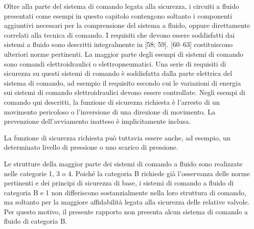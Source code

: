 \begin{center}
    \begin{minipage}{\textwidth}
        \centering
        \captionsetup{hypcap=false}
        \resizebox{0.92\textwidth}{!}{}
        \label{fig:08-01}
    \end{minipage}
\end{center}

\begin{center}
    \begin{minipage}{\textwidth}
        \centering
        \captionsetup{hypcap=false}
        \resizebox{!}{0.62\textheight}{}
        \label{fig:08-02}
    \end{minipage}
\end{center}

Oltre alla parte del sistema di comando legata alla sicurezza, i circuiti a fluido presentati come esempi in questo capitolo contengono soltanto i componenti aggiuntivi necessari per la comprensione del sistema a fluido, oppure direttamente correlati alla tecnica di comando. I requisiti che devono essere soddisfatti dai sistemi a fluido sono descritti integralmente in [58; 59]. [60–63] costituiscono ulteriori norme pertinenti.
La maggior parte degli esempi di sistemi di comando sono comandi elettroidraulici o elettropneumatici. Una serie di requisiti di sicurezza su questi sistemi di comando è soddisfatta dalla parte elettrica del sistema di comando, ad esempio il requisito secondo cui le variazioni di energia sui sistemi di comando elettroidraulici devono essere controllate.
Negli esempi di comando qui descritti, la funzione di sicurezza richiesta è l'arresto di un movimento pericoloso o l'inversione di una direzione di movimento. La prevenzione dell'avviamento inatteso è implicitamente inclusa.

La funzione di sicurezza richiesta può tuttavia essere anche, ad esempio, un determinato livello di pressione o uno scarico di pressione.

Le strutture della maggior parte dei sistemi di comando a fluido sono realizzate nelle categorie 1, 3 o 4. Poiché la categoria B richiede già l'osservanza delle norme pertinenti e dei principi di sicurezza di base, i sistemi di comando a fluido di categoria B e 1 non differiscono sostanzialmente nella loro struttura di comando, ma soltanto per la maggiore affidabilità legata alla sicurezza delle relative valvole. Per questo motivo, il presente rapporto non presenta alcun sistema di comando a fluido di categoria B.

